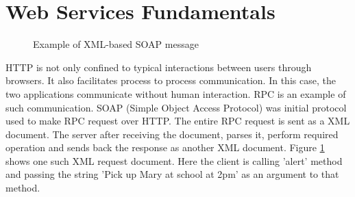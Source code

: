 \documentclass[twoside]{article}
\begin{document}
\section{Web Services Fundamentals}
\begin{figure}[h]
\begin{center}
\caption{Example of XML-based SOAP message}
\label{soap_ex}
\end{center}
\end{figure}
HTTP is not only confined to typical interactions between users through browsers. It also facilitates process to process communication. In this case, the two applications communicate without human interaction. RPC is an example of such communication. SOAP (Simple Object Access Protocol) was initial protocol used to make RPC request over HTTP. The entire RPC request is sent as a XML document. The server after receiving the document, parses it, perform required operation and sends back the response as another XML document. Figure \ref{soap_ex} shows one such XML request document. Here the client is calling 'alert' method and passing the string 'Pick up Mary at school at 2pm' as an argument to that method. \\
\end{document}
